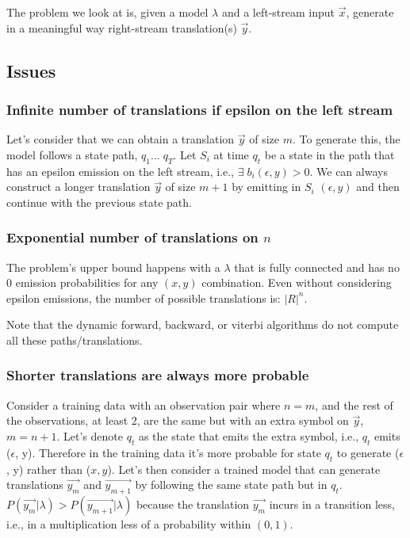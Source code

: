 \documentclass[a4paper,10pt]{article}
\begin{document}
The problem we look at is, given a model $\lambda$ and a left-stream input
$\vec{x}$, generate in a meaningful way right-stream translation(s) $\vec{y}$.

\subsection{Issues}

\subsubsection{Infinite number of translations if epsilon on the left stream}

Let's consider that we can obtain a translation $\vec{y}$ of size $m$. To
generate this, the model follows a state path, $q_1 ... \; q_T$. Let $S_i$ at
time $q_t$ be a state in the path that has an epsilon emission on the left
stream, i.e., $\exists \; b_i(\epsilon, y) > 0$. We can always construct a
longer translation $\vec{y}$ of size $m+1$ by emitting in $S_i$ $(\epsilon, y)$
and then continue with the previous state path.

\subsubsection{Exponential number of translations on $n$}

The problem's upper bound happens with a $\lambda$ that is fully connected and
has no 0 emission probabilities for any $(x, y)$ combination. Even without
considering epsilon emissions, the number of possible translations is:
${|R|}^n$.

Note that the dynamic forward, backward, or viterbi algorithms do not compute
all these paths/translations.

\subsubsection{Shorter translations are always more probable}\label{sec:shorter_more}

Consider a training data with an observation pair where $n = m$, and the rest of
the observations, at least 2, are the same but with an extra symbol on
$\vec{y}$, $m = n + 1$. Let's denote $q_t$ as the state that emits the extra
symbol, i.e., $q_t$ emits ($\epsilon$, y). Therefore in the training data it's
more probable for state $q_t$ to generate ($\epsilon$, y) rather than ($x,
y$). Let's then consider a trained model that can generate translations
$\vec{y_m}$ and $\vec{y_{m+1}}$ by following the same state path but in
$q_t$. $P(\vec{y_m}|\lambda) > P(\vec{y_{m+1}}|\lambda)$ because the translation
$\vec{y_m}$ incurs in a transition less, i.e., in a multiplication less of a
probability within $(0, 1)$.
\end{document}
